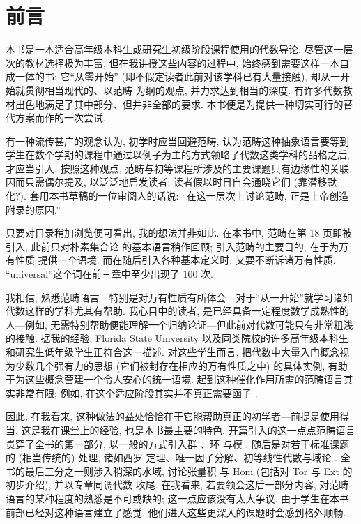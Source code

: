 
\chapter*{前言}

本书是一本适合高年级本科生或研究生初级阶段课程使用的代数导论.%
尽管这一层次的教材选择极为丰富, 但在我讲授这些内容的过程中, 始终感到需要这样一本自成一体的书: 它``从零开始'' (即不假定读者此前对该学科已有大量接触), 却从一开始就贯彻相当现代的、以范畴%
为纲的观点, 并力求达到相当的深度. 有许多代数教材出色地满足了其中部分、但并非全部的要求. 本书便是为提供一种切实可行的替代方案而作的一次尝试.

有一种流传甚广的观念认为, 初学时应当回避范畴, 认为范畴这种抽象语言要等到学生在数个学期的课程中通过以例子为主的方式领略了代数这类学科的品格之后, 才应当引入. 按照这种观点, 范畴与初等课程所涉及的主要课题只有边缘性的关联, 因而只需偶尔提及, 以泛泛地启发读者; 读者假以时日自会通晓它们 (靠潜移默化?). 套用本书草稿的一位审阅人的话说: ``在这一层次上讨论范畴, 正是上帝创造附录的原因.''

只要对目录稍加浏览便可看出, 我的想法并非如此. 在本书中, 范畴在第 $18$ 页即被引入, 此前只对朴素集合论%
的基本语言稍作回顾; 引入范畴的主要目的, 在于为万有性质%
提供一个语境. 而在随后引入各种基本定义时, 又要不断诉诸万有性质. ``universal''这个词在前三章中至少出现了 $100$ 次.

我相信, 熟悉范畴语言---特别是对万有性质有所体会---对于``从一开始''就学习诸如代数这样的学科尤其有帮助. 我心目中的读者, 是已经具备一定程度数学成熟性的人---例如, 无需特别帮助便能理解一个归纳论证---但此前对代数可能只有非常粗浅的接触. 据我的经验, Florida State University 以及同类院校的许多高年级本科生和研究生低年级学生正符合这一描述. 对这些学生而言, 把代数中大量入门概念视为少数几个强有力的思想 (它们被封存在相应的万有性质之中) 的具体实例, 有助于为这些概念营建一个令人安心的统一语境. 起到这种催化作用所需的范畴语言其实非常有限; 例如, 在这个适应阶段其实并不真正需要函子%
.

因此, 在我看来, 这种做法的益处恰恰在于它能帮助真正的初学者---前提是使用得当. 这是我在课堂上的经验, 也是本书最主要的特色. 开篇引入的这一点点范畴语言贯穿了全书的第一部分, 以一般的方式引入群%
、环%
与模%
. 随后是对若干标准课题的 (相当传统的) 处理, 诸如西罗%
定理、唯一因子分解、初等线性代数与域论%
. 全书的最后三分之一则涉入稍深的水域, 讨论张量积%
与 Hom (包括对 Tor 与 Ext 的初步介绍), 并以专章同调代数%
收尾. 在我看来, 若要领会这后一部分内容, 对范畴语言的某种程度的熟悉是不可或缺的; 这一点应该没有太大争议. 由于学生在本书前部已经对这种语言建立了感觉, 他们进入这些更深入的课题时会感到格外顺畅.

